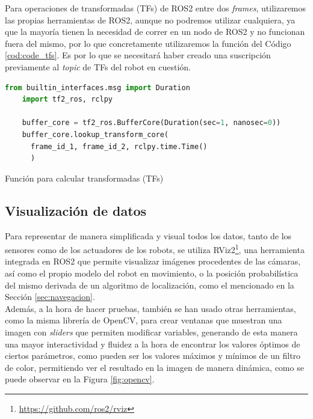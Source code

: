 Para operaciones de transformadas (TFs) de ROS2 entre dos \textit{frames},
utilizaremos las propias herramientas de ROS2, aunque no podremos utilizar
cualquiera, ya que la mayoría tienen la necesidad de correr en un nodo de ROS2
y no funcionan fuera del mismo, por lo que concretamente utilizaremos la
función del Código \ref{cod:code_tfs}.
Es por lo que se necesitará haber creado una suscripción previamente al
\textit{topic} de TFs del robot en cuestión.
\\

\begin{code}[h!]
  \begin{lstlisting}[language=Python]
    from builtin_interfaces.msg import Duration
    import tf2_ros, rclpy

    buffer_core = tf2_ros.BufferCore(Duration(sec=1, nanosec=0))
    buffer_core.lookup_transform_core(
      frame_id_1, frame_id_2, rclpy.time.Time()
      )
  \end{lstlisting}
  \caption[Función para calcular transformadas]{Función para calcular transformadas (TFs)}
  \label{cod:code_tfs}
\end{code}


\subsection{Visualización de datos}
\label{sec:visualizacion_datos}

Para representar de manera simplificada y visual todos los datos, tanto de los
sensores como de los actuadores de los robots, se utiliza
RViz2\footnote{
\href{https://github.com/ros2/rviz}{https://github.com/ros2/rviz}}, una
herramienta integrada en ROS2 que permite visualizar imágenes procedentes de las
cámaras, así como el propio modelo del robot en movimiento, o la posición
probabilística del mismo derivada de un algoritmo de localización, como el
mencionado en la Sección \ref{sec:navegacion}.
\\

Además, a la hora de hacer pruebas, también se han usado otras herramientas, como
la misma librería de OpenCV, para crear ventanas que muestran una imagen con
\textit{sliders} que permiten modificar variables, generando de esta manera una
mayor interactividad y fluidez a la hora de encontrar los valores óptimos de
ciertos parámetros, como pueden ser los valores máximos y mínimos de un filtro
de color, permitiendo ver el resultado en la imagen de manera dinámica, como se
puede observar en la Figura \ref{fig:opencv}.
\\

